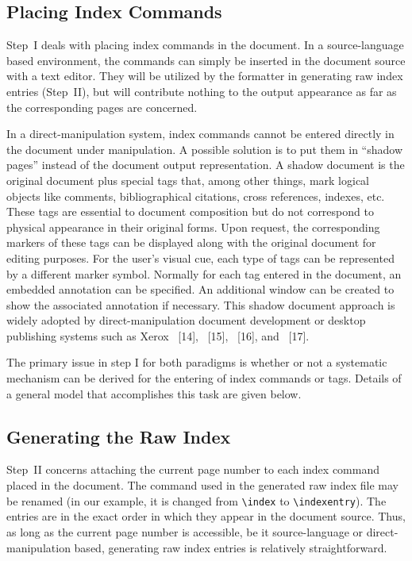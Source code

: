\subsection{Placing Index Commands}
Step~I deals with placing index commands in the document.
In a source-language based environment, the commands can simply be inserted
in the document source with a text editor.
They will be utilized by the formatter in generating
raw index entries (Step~II), but will contribute nothing to the output
appearance as far as the corresponding pages are concerned.

In a direct-manipulation system, index commands cannot be entered directly in
the document under manipulation.  A possible solution is to put them
in ``shadow pages'' instead of the document output representation.
A shadow document is the original document plus
special tags that, among other things,
mark logical objects like comments, bibliographical citations,
cross references, indexes, etc.
These tags are essential to document composition but do not correspond to
physical appearance in their original forms.  Upon request, the corresponding
markers of these tags can be displayed along with the original document
for editing purposes.  For the user's visual cue, each type of tags can be
represented by a different marker symbol.
Normally for each tag entered in the
document, an embedded annotation can be specified.
An additional window can be created to show the associated annotation
if necessary.  This shadow document approach is widely adopted by
direct-manipulation document development or desktop publishing systems
such as Xerox {\ST}~[14], {\FM}~[15],
{\WD}~[16], and {\VP}~[17].

The primary issue in step I for both paradigms
is whether or not a systematic mechanism
can be derived for the entering of index commands or tags.
Details of a general model that accomplishes this task are given below.


\subsection{Generating the Raw Index}
Step~II concerns attaching the current page number to each index
command placed in the document.  The command used in the generated
raw index file may be renamed (in our example, it is changed
from \verb|\index| to \verb|\indexentry|).
The entries are in the exact order in which they appear in the document source.
Thus, as long as the current page number is accessible, be it
source-language or direct-manipulation based, generating raw index entries
is relatively straightforward.


